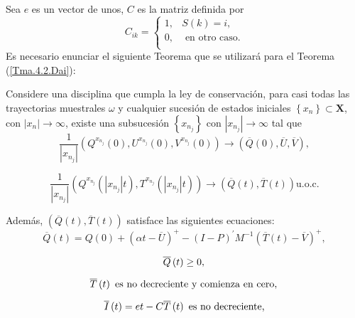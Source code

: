 Sea $e$ es un vector de unos, $C$ es la matriz definida por
\[C_{ik}=\left\{\begin{array}{cc}
1,& S\left(k\right)=i,\\
0,& \textrm{ en otro caso}.\\
\end{array}\right.
\]
Es necesario enunciar el siguiente Teorema que se utilizar\'a para
el Teorema (\ref{Tma.4.2.Dai}):
\begin{Teo}
Considere una disciplina que cumpla la ley de conservaci\'on, para
casi todas las trayectorias muestrales $\omega$ y cualquier
sucesi\'on de estados iniciales $\left\{x_{n}\right\}\subset
\mathbf{X}$, con $|x_{n}|\rightarrow\infty$, existe una
subsucesi\'on $\left\{x_{n_{j}}\right\}$ con
$|x_{n_{j}}|\rightarrow\infty$ tal que
\begin{equation}\label{Eq.4.15}
\frac{1}{|x_{n_{j}}|}\left(Q^{x_{n_{j}}}\left(0\right),U^{x_{n_{j}}}\left(0\right),V^{x_{n_{j}}}\left(0\right)\right)\rightarrow\left(\overline{Q}\left(0\right),\overline{U},\overline{V}\right),
\end{equation}

\begin{equation}\label{Eq.4.16}
\frac{1}{|x_{n_{j}}|}\left(Q^{x_{n_{j}}}\left(|x_{n_{j}}|t\right),T^{x_{n_{j}}}\left(|x_{n_{j}}|t\right)\right)\rightarrow\left(\overline{Q}\left(t\right),\overline{T}\left(t\right)\right)\textrm{
u.o.c.}
\end{equation}

Adem\'as,
$\left(\overline{Q}\left(t\right),\overline{T}\left(t\right)\right)$
satisface las siguientes ecuaciones:
\begin{equation}\label{Eq.MF.1.3a}
\overline{Q}\left(t\right)=Q\left(0\right)+\left(\alpha
t-\overline{U}\right)^{+}-\left(I-P\right)^{'}M^{-1}\left(\overline{T}\left(t\right)-\overline{V}\right)^{+},
\end{equation}

\begin{equation}\label{Eq.MF.2.3a}
\overline{Q}\left(t\right)\geq0,\\
\end{equation}

\begin{equation}\label{Eq.MF.3.3a}
\overline{T}\left(t\right)\textrm{ es no decreciente y comienza en cero},\\
\end{equation}

\begin{equation}\label{Eq.MF.4.3a}
\overline{I}\left(t\right)=et-C\overline{T}\left(t\right)\textrm{
es no decreciente,}\\
\end{equation}


\end{Teo}
